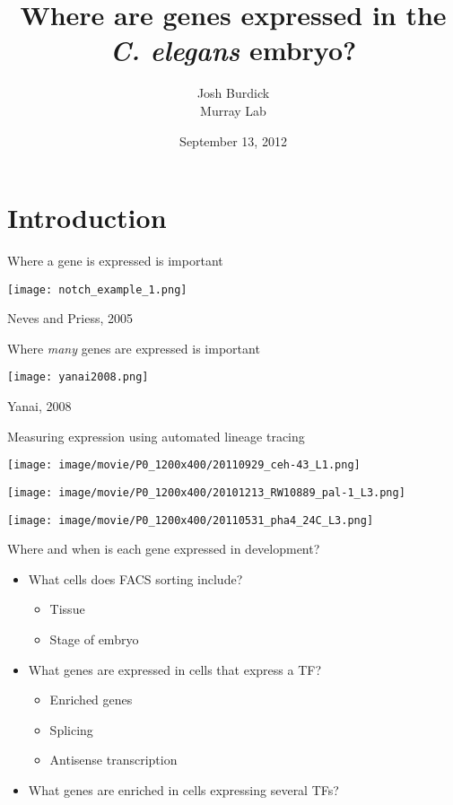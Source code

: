 \documentclass[serif,9pt]{beamer}
\title{Where are genes expressed in the {\em C. elegans} embryo?}
\author{Josh Burdick \\ Murray Lab}
\date{September 13, 2012}
\begin{document}
\begin{frame}
\titlepage
\end{frame}

\begin{frame}
\tableofcontents
\end{frame}

\section{Introduction}

\begin{frame}{Where a gene is expressed is important}

\begin{centering}
\texttt{[image: notch\_example\_1.png]}
\end{centering}

\hfill Neves and Priess, 2005

\end{frame}

\begin{frame}{Where {\em many} genes are expressed is important}

\texttt{[image: yanai2008.png]}

\hfill Yanai, 2008

\end{frame}

\begin{frame}{Measuring expression using automated lineage tracing}

{\center
\texttt{[image: image/movie/P0\_1200x400/20110929\_ceh-43\_L1.png]}

\texttt{[image: image/movie/P0\_1200x400/20101213\_RW10889\_pal-1\_L3.png]}

\texttt{[image: image/movie/P0\_1200x400/20110531\_pha4\_24C\_L3.png]}

}

\end{frame}

\begin{frame}{Where and when is each gene expressed in development?}
\begin{itemize}
\item What cells does FACS sorting include?
\begin{itemize}
\item Tissue
\item Stage of embryo
\end{itemize}
\item What genes are expressed in cells that express a TF?
\begin{itemize}
\item Enriched genes
\item Splicing
\item Antisense transcription
\end{itemize}
\item What genes are enriched in cells expressing several TFs?
\end{itemize}
\end{frame}
\end{document}
